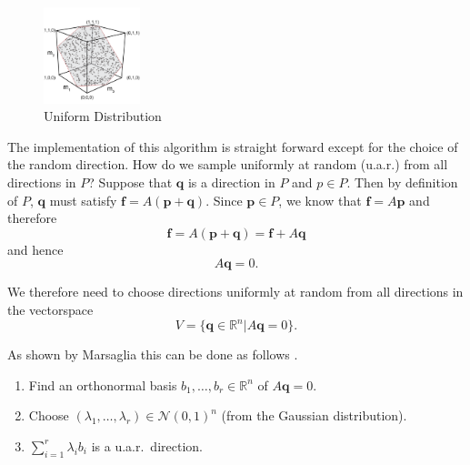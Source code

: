 
\begin{figure}[ht]
   \begin{center}
    \includegraphics[width=0.25\textwidth]{uniform.png}
      \caption{Uniform Distribution}
      \label{fig_hr5}
  \end{center}
\end{figure}


The implementation of this algorithm is straight forward except for the choice of the random direction. How do we sample uniformly at random (u.a.r.) from all directions in $P$? Suppose that $\textbf{q}$ is a direction in $P$ and $p \in P$. Then by definition of $P$, $\textbf{q}$ must satisfy $\textbf{f} = A(\textbf{p}+\textbf{q})$. Since $\textbf{p} \in P$, we know that $\textbf{f} = A\textbf{p}$ and therefore 
\[\textbf{f} = A(\textbf{p} + \textbf{q}) = \textbf{f} + A\textbf{q}\]
and hence
\[A\textbf{q} = 0.\]

We therefore need to choose directions uniformly at random from all directions in the vectorspace 
\[V = \{\textbf{q} \in \mathbb{R}^n | A\textbf{q} = 0\}.\]

As shown by Marsaglia this can be done as follows \cite{Marsaglia}.

\begin{enumerate}
\item
Find an orthonormal basis $b_1, \dots, b_r \in \mathbb{R}^{n}$ of $A\textbf{q} =0$.
\item
Choose $(\lambda_1, \dots, \lambda_r) \in \mathcal{N}(0,1)^n$ (from the Gaussian distribution).
\item
$\sum_{i=1}^r \lambda_i b_i$ is a u.a.r.\ direction.
\end{enumerate}

